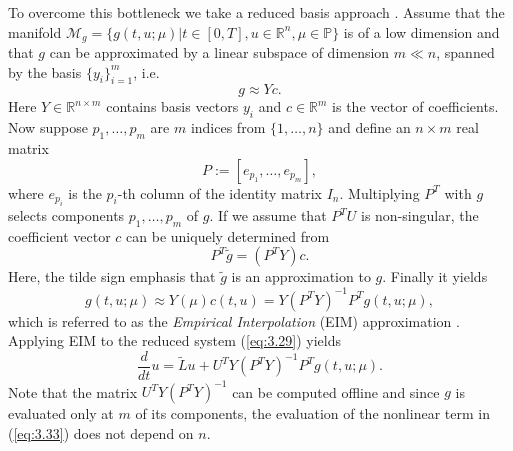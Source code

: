To overcome this bottleneck we take a reduced basis approach \cite{doi:10.1137/090766498,barrault2004empirical}. Assume that the manifold $\mathcal M_{g} = \{ g(t,u;\mu)| t\in [0,T], u \in \mathbb R^n , \mu \in \mathbb P\}$ is of a low dimension and that $g$ can be approximated by a linear subspace of dimension $m\ll n$, spanned by the basis $\{ y_i \}_{i=1}^m$, i.e.
\begin{equation} \label{eq:3.30}
	g \approx Yc.
\end{equation}
Here $Y\in \mathbb R^{n\times m}$ contains basis vectors $y_i$ and $c\in \mathbb R^{m}$ is the vector of coefficients. Now suppose $p_1,\dots,p_m$ are $m$ indices from $\{1,\dots,n\}$ and define an $n\times m$ real matrix
\begin{equation} \label{eq:MoOr:11}
P := [e_{p_1},\dots,e_{p_m}],
\end{equation}
where $e_{p_i}$ is the $p_i$-th column of the identity matrix $I_n$. Multiplying $P^T$ with $g$ selects components $p_1,\dots,p_m$ of $g$. If we assume that $P^TU$ is non-singular, the coefficient vector $c$ can be uniquely determined from
\begin{equation} \label{eq:3.31}
	P^T \tilde g = (P^T Y) c.
\end{equation}
Here, the tilde sign emphasis that $\tilde g$ is an approximation to $g$. Finally it yields 
\begin{equation} \label{eq:3.32}
	g(t,u;\mu) \approx Y(\mu) c(t,u) = Y (P^TY)^{-1} P^T g(t,u;\mu),
\end{equation}
which is referred to as the \emph{Empirical Interpolation} (EIM) approximation \cite{barrault2004empirical}. Applying EIM to the reduced system (\ref{eq:3.29}) yields
\begin{equation} \label{eq:3.33}
	\frac{d}{dt} u = \tilde L u + U^T Y (P^TY)^{-1} P^T g(t,u;\mu).
\end{equation}
Note that the matrix $U^T Y (P^TY)^{-1}$ can be computed offline and since $g$ is evaluated only at $m$ of its components, the evaluation of the nonlinear term in (\ref{eq:3.33}) does not depend on $n$.

